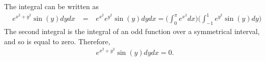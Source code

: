 \documentclass{article}
\begin{document}
\item %
The integral can be written as
\begin{align*}
  \mathop{\int_0^{\pi} \!\! \int_{-1}^1} e^{x^2 + y^2}\sin(y) dydx 
  &= \mathop{\int_0^{\pi} \!\! \int_{-1}^1} e^{x^2}e^{y^2}\sin(y) dydx  = \Bigg( \int_0^{\pi} e^{x^2} dx \Bigg)\Bigg( \int_{-1}^1 e^{y^2}\sin(y)dy \Bigg)  
\end{align*}
The second integral is the integral of an odd function over a symmetrical interval, and so is equal to zero. Therefore,
\begin{align*}
  \mathop{\int_0^{\pi} \!\! \int_{-1}^1} e^{x^2 + y^2}\sin(y) dydx =0.
\end{align*}

\EEN %
\end{document}
